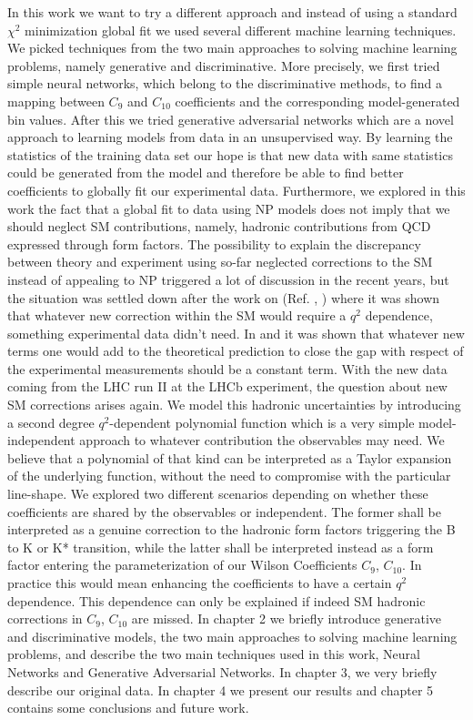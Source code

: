 \documentclass[a4paper,fleqn]{cas-dc}
\begin{document}
In this work we want to try a different approach and instead of using a standard \(\chi^2 \) minimization global fit we used several different machine learning techniques. We picked techniques from the two main approaches to solving machine learning problems, namely generative and discriminative. More precisely, we first tried simple neural networks, which belong to the discriminative methods, to find a mapping between \(C_9\) and \(C_{10}\) coefficients and the corresponding model-generated bin values. After this we tried generative adversarial networks which are a novel approach to learning models from data in an unsupervised way. By learning the statistics of the training data set our hope is that new data with same statistics could be generated from the model and therefore be able to find better coefficients to globally fit our experimental data. Furthermore, we explored in this work the fact that a global fit to data using NP models does not imply that we should neglect SM contributions, namely, hadronic contributions from QCD expressed through form factors. The possibility to explain the discrepancy between theory and experiment using so-far neglected corrections to the SM instead of appealing to NP triggered a lot of discussion in the recent years, but the situation was settled down after the work on (Ref. \cite{Capdevila_2017}, \cite{Descotes_Genon_2016}) where it was shown that whatever new correction within the SM would require a \(q^2\) dependence, something experimental data didn't need. In \cite{Capdevila_2017} and \cite{Descotes_Genon_2016} it was shown that whatever new terms one would add to the theoretical prediction to close the gap with respect of the experimental measurements should be a constant term. 
With the new data coming from the LHC run II at the LHCb experiment, the question about new SM corrections arises again. We model this hadronic uncertainties by introducing a second degree \(q^2 \)-dependent polynomial function which is a very simple model-independent approach to whatever contribution the observables may need. We believe that a polynomial of that kind can be interpreted as a Taylor expansion of the underlying function, without the need to compromise with the particular line-shape. We explored two different scenarios depending on whether these coefficients are shared by the observables or independent. The former shall be interpreted as a genuine correction to the hadronic form factors triggering the B to K or K* transition, while the latter shall be interpreted instead as a form factor entering the parameterization of our Wilson Coefficients \(C_9\), \(C_{10}\). In practice this would mean enhancing the coefficients to have a certain \(q^2 \) dependence. This dependence can only be explained if indeed SM hadronic corrections in \(C_9\), \(C_{10}\) are missed.
In chapter 2 we briefly introduce generative and discriminative models,  the two main approaches to solving machine learning problems, and describe the two main techniques used in this work, Neural Networks and Generative Adversarial Networks. In chapter 3, we very briefly describe our original data. In chapter 4 we present our results and chapter 5 contains some conclusions and future work.
\end{document}
